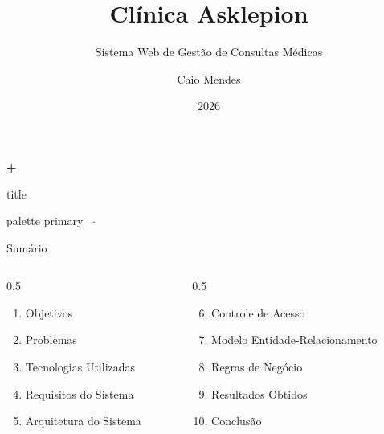 \documentclass[xcolor={table}]{beamer}
\title{Clínica Asklepion}
\subtitle{Sistema Web de Gestão de Consultas Médicas}
\author{Caio Mendes}
\institute{Clínica Asklepion}
\date{2026}
\begin{document}
\begin{frame}[plain]
    \centering
    \vspace{0.8cm}
    {\color{ClinicBlue}\Huge\textbf{+}}\\
    \vspace{0.4cm}
    \begin{beamercolorbox}[sep=8pt,center,shadow=true,rounded=true]{title}
        \inserttitle\par
        \vspace{2pt}
        \insertsubtitle\par
    \end{beamercolorbox}
    \vspace{0.5cm}
    \begin{beamercolorbox}[sep=5pt,center,rounded=true]{palette primary}
        \insertauthor\ $\cdot$\ \insertdate
    \end{beamercolorbox}
\end{frame}

\begin{frame}{Sumário}
    \begin{columns}
        \begin{column}{0.5\textwidth}
            \begin{enumerate}
                \item Objetivos
                \item Problemas
                \item Tecnologias Utilizadas
                \item Requisitos do Sistema
                \item Arquitetura do Sistema
            \end{enumerate}
        \end{column}
        \begin{column}{0.5\textwidth}
            \begin{enumerate}
                \setcounter{enumi}{5}
                \item Controle de Acesso
                \item Modelo Entidade-Relacionamento
                \item Regras de Negócio
                \item Resultados Obtidos
                \item Conclusão
            \end{enumerate}
        \end{column}
    \end{columns}
\end{frame}
\end{document}
